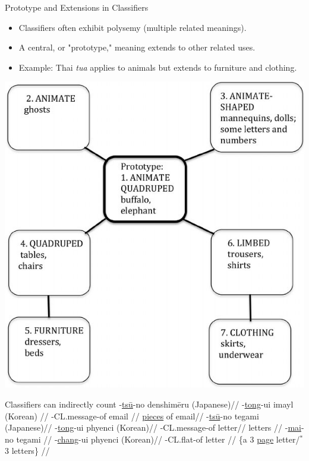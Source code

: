 \documentclass{beamer}
\newcommand{\cll}[1]{\uline{#1}}
\begin{document}
\begin{frame}{Prototype and Extensions in Classifiers}
\begin{itemize}
    \item Classifiers often exhibit polysemy (multiple related meanings).
    \item A central, or "prototype," meaning extends to other related uses.
    \item Example: Thai \textit{tua} applies to animals but extends to furniture and clothing.
\end{itemize}
 \begin{center}
\noindent\includegraphics[height=0.6\textheight]{pics/Radial-category-structure-for-Thai-classifier-tua-Source-Adapted-from-Deepadung_W640.jpg}
 \end{center}
\end{frame}
\begin{frame}{Classifiers can indirectly count}
  \ex
  \begingl
  -\cll{ts\=u}-no denshim\=eru (Japanese)//
  -\cll{tong}-ui imayl (Korean) //
  -CL.message-of email //
   \cll{pieces} of email//
  \endgl
  \xe
  \ex
  \begingl
  -\cll{ts\=u}-no tegami (Japanese)//
  -\cll{tong}-ui phyenci (Korean)//
  -CL.message-of letter//
  letters           //%
  \endgl
\xe\ex
  \begingl
{}-\cll{mai}-no tegami //
-\cll{chang}-ui phyenci (Korean)//
-CL.flat-of letter //
\glft \{a 3 \cll{page} letter/$^*$3 letters\}  //%
  \endgl
  \xe
\citep{Bond:1997b}
\end{frame}
\end{document}
